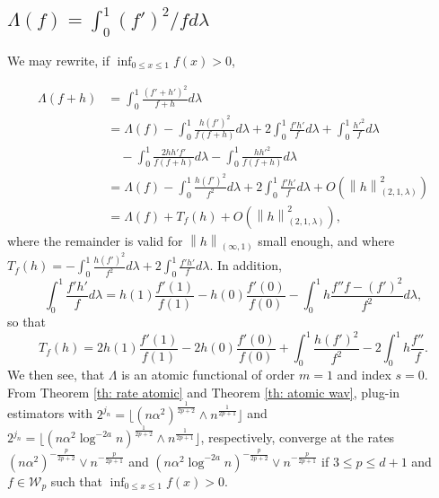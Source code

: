 \documentclass[preprint]{imsart}
\newcommand\norm[1]{\left\lVert#1\right\rVert}
\numberwithin{equation}{section}
\newcounter{cond}
\begin{document}
\subsection{$\Lambda(f)=\int_0^1(f')^2/fd\lambda$}

We may rewrite, if $\inf_{0\leq x\leq 1} f(x)>0$,

\begin{align*}
    \Lambda(f+h) &= \int_0^1\frac{(f' + h')^2}{f+h}d\lambda\\
    &= \Lambda(f) -  \int_0^1\frac{h(f')^2}{f(f+h)}d\lambda + 2\int_0^1 \frac{f'h'}{f}d\lambda + \int_0^1 \frac{h'^2}{f}d\lambda\\
    &\quad -\int_0^1 \frac{2hh'f'}{f(f+h)}d\lambda-\int_0^1 \frac{hh'^2}{f(f+h)}d\lambda\\
    &= \Lambda(f) - \int_0^1\frac{h(f')^2}{f^2}d\lambda + 2\int_0^1 \frac{f'h'}{f}d\lambda + O\left(\norm{h}^2_{(2,1,\lambda)}\right)\\
    &= \Lambda(f) + T_f(h) + O\left(\norm{h}^2_{(2,1,\lambda)}\right), 
\end{align*}
where the remainder is valid for $\norm{h}_{(\infty, 1)}$ small enough, and where $T_f(h) = - \int_0^1\frac{h(f')^2}{f^2}d\lambda + 2\int_0^1 \frac{f'h'}{f}d\lambda$. In addition,
\[\int_0^1 \frac{f'h'}{f}d\lambda = h(1) \frac{f'(1)}{f(1)}  - h(0) \frac{f'(0)}{f(0)} - \int_0^1 h \frac{f''f-(f')^2}{f^2}d\lambda,\]
so that
\[T_f(h) = 2h(1) \frac{f'(1)}{f(1)}  - 2h(0) \frac{f'(0)}{f(0)} + \int_0^1\frac{h(f')^2}{f^2} - 2\int_0^1h\frac{f''}{f}.\]
We then see, that $\Lambda$ is an atomic functional of order $m=1$ and index $s=0$. From Theorem \ref{th: rate atomic} and Theorem \ref{th: atomic wav}, plug-in estimators with $2^{j_n} = \lfloor(n\alpha^2)^{\frac{1}{2p+2}}\wedge n^{\frac{1}{2p+1}}\rfloor$ and $2^{j_n} = \lfloor(n\alpha^2\log^{-2a} n)^{\frac{1}{2p+2}}\wedge n^{\frac{1}{2p+1}}\rfloor$, respectively, converge at the rates $(n\alpha^2)^{-\frac{p}{2p+2}}\vee n^{-\frac{p}{2p+1}}$ and $(n\alpha^2 \log^{-2a} n)^{-\frac{p}{2p+2}}\vee n^{-\frac{p}{2p+1}}$ if $3\leq p\leq d+1$ and $f\in\mathcal{W}_{p}$ such that $\inf_{0\leq x\leq 1} f(x)>0$.

\end{document}
